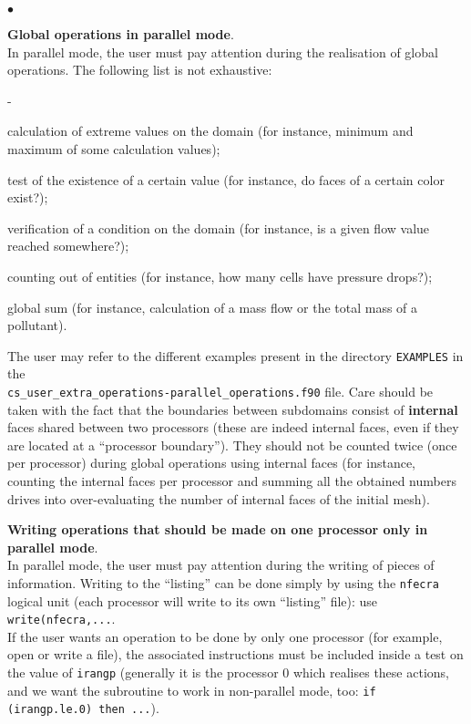 {{{\begin{list}{$\bullet$}{}
\item {\bf Global operations in parallel mode}.\\
In parallel mode, the user must pay attention during the realisation of
      global operations. The following list is not exhaustive:
        \begin{list}{-}{}
\item calculation of extreme values on the domain (for instance, minimum
      and maximum of some calculation values);
\item test of the existence of a certain value (for instance, do faces
      of a certain color exist?);
\item verification of a condition on the domain (for instance, is a
      given flow value reached somewhere?);
\item counting out of entities (for instance, how many cells have
      pressure drops?);
\item global sum (for instance, calculation of a mass flow or the total
      mass of a pollutant).
      \end{list}
The user may refer to the different examples present in the directory \texttt{EXAMPLES} in the\\
\texttt{cs\_user\_extra\_operations-parallel\_operations.f90} file.
Care should be taken with the fact that the boundaries between
      subdomains consist of {\bf internal} faces shared between
      two processors (these are indeed internal faces, even if they are
      located at a ``processor boundary''). They should not be counted twice
      (once per processor) during global operations using internal faces
      (for instance, counting the internal faces per processor and
      summing all the obtained numbers drives into over-evaluating the
      number of internal faces of the initial mesh).

\item {\bf Writing operations that should be made on one
      processor only in parallel mode}.\\
In parallel mode, the user must pay attention during the writing of
      pieces of information. Writing to the ``listing'' can be done
      simply by using the \texttt{nfecra} logical unit (each processor will write
      to its own ``listing'' file): use
      \texttt{write(nfecra,...}. \\
If the user wants an operation to be done by only one processor (for
      example, open or write a file), the associated instructions must
      be included inside a test on the value of \texttt{irangp} (generally it is
      the processor 0 which realises these actions, and we want the
      subroutine to work in non-parallel mode, too: \texttt{if
      (irangp.le.0) then ...}).
\end{list}

}}}
